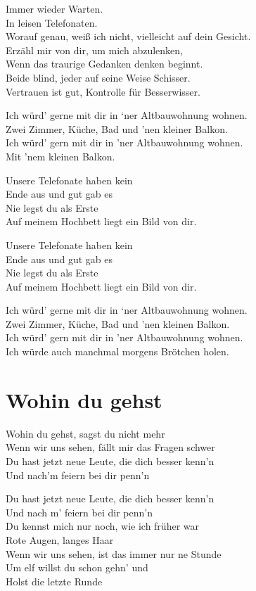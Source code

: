 \documentclass[]{book}
\begin{document}
Immer wieder Warten.\\
In leisen Telefonaten.\\
Worauf genau, weiß ich nicht, vielleicht auf dein Gesicht.\\
Erzähl mir von dir, um mich abzulenken,\\
Wenn das traurige Gedanken denken beginnt.\\
Beide blind, jeder auf seine Weise Schisser.\\
Vertrauen ist gut, Kontrolle für Besserwisser.

Ich würd' gerne mit dir in `ner Altbauwohnung wohnen.\\
Zwei Zimmer, Küche, Bad und 'nen kleiner Balkon.\\
Ich würd' gern mit dir in 'ner Altbauwohnung wohnen.\\
Mit 'nem kleinen Balkon.

Unsere Telefonate haben kein\\
Ende aus und gut gab es\\
Nie legst du als Erste\\
Auf meinem Hochbett liegt ein Bild von dir.

Unsere Telefonate haben kein\\
Ende aus und gut gab es\\
Nie legst du als Erste\\
Auf meinem Hochbett liegt ein Bild von dir.

Ich würd' gerne mit dir in `ner Altbauwohnung wohnen.\\
Zwei Zimmer, Küche, Bad und 'nen kleinen Balkon.\\
Ich würd' gern mit dir in 'ner Altbauwohnung wohnen.\\
Ich würde auch manchmal morgens Brötchen holen.

\hypertarget{wohin-du-gehst}{%
\section{Wohin du gehst}\label{wohin-du-gehst}}

Wohin du gehst, sagst du nicht mehr\\
Wenn wir uns sehen, fällt mir das Fragen schwer\\
Du hast jetzt neue Leute, die dich besser kenn'n\\
Und nach'm feiern bei dir penn'n

Du hast jetzt neue Leute, die dich besser kenn'n\\
Und nach m' feiern bei dir penn'n\\
Du kennst mich nur noch, wie ich früher war\\
Rote Augen, langes Haar\\
Wenn wir uns sehen, ist das immer nur ne Stunde\\
Um elf willst du schon gehn' und\\
Holst die letzte Runde
\end{document}
